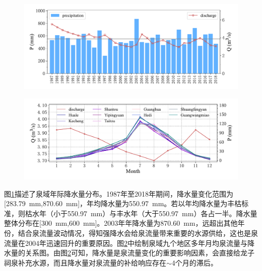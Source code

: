 \begin{figure}[!htbp]
  \centering
  \includegraphics[width=\textwidth]{Img/chap4_spr/spr_total_precipitation_yearly}
  \vspace{-1cm}
  \label{fig:spr_total_precipitation_yearly}
\end{figure}

\begin{figure}[!htbp]
  \centering
  \includegraphics[width=\textwidth]{Img/chap4_spr/spr_discharge_month}
  \vspace{-1cm}
  \label{fig:spr_discharge_month}
\end{figure}

图\ref{fig:spr_total_precipitation_yearly}描述了泉域年际降水量分布。1987年至2018年期间，降水量变化范围为[\SI{283.79}{mm},\SI{870.60}{mm}]，年均降水量为\SI{550.97}{mm}。若以年均降水量为丰枯标准，则枯水年（小于\SI{550.97}{mm}）与丰水年（大于\SI{550.97}{mm}）各占一半。降水量整体分布在[\SI{300}{mm},\SI{600}{mm}]。2003年年降水量为\SI{870.60}{mm}，远超出其他年份，结合泉流量波动情况，得知强降水会给泉流量带来重要的水源供给，这也是泉流量在2004年迅速回升的重要原因。图\ref{fig:spr_discharge_month}中绘制泉域九个地区多年月均泉流量与降水量的关系图。由图\ref{fig:spr_discharge_month}可知，降水量是泉流量变化的重要影响因素，会直接给龙子祠泉补充水源，而且降水量对泉流量的补给响应存在$\sim$4个月的滞后。


